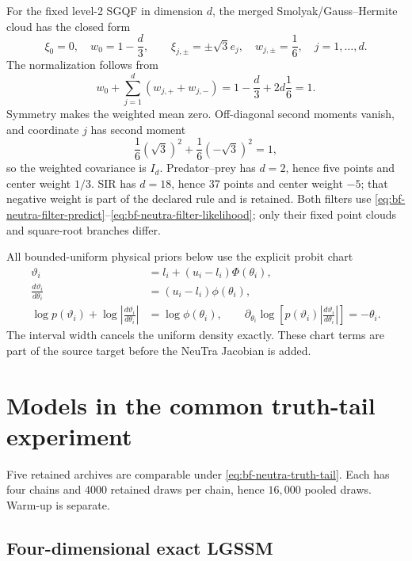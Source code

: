 For the fixed level-2 SGQF in dimension $d$, the merged Smolyak/Gauss--Hermite
cloud has the closed form
\begin{equation}
 \xi_0=0,\quad w_0=1-\frac d3,\qquad
 \xi_{j,\pm}=\pm\sqrt3e_j,\quad w_{j,\pm}=\frac16,\quad j=1,\ldots,d.
 \label{eq:bf-neutra-sgqf-rule}
\end{equation}
The normalization follows from
\begin{equation}
 w_0+\sum_{j=1}^d(w_{j,+}+w_{j,-})
 =1-\frac d3+2d\frac16=1.
\end{equation}
Symmetry makes the weighted mean zero.  Off-diagonal second moments vanish,
and coordinate $j$ has second moment
\begin{equation}
 \frac16(\sqrt3)^2+\frac16(-\sqrt3)^2=1,
\end{equation}
so the weighted covariance is $I_d$.  Predator--prey has $d=2$, hence five
points and center weight $1/3$.  SIR has $d=18$, hence 37 points and center
weight $-5$; that negative weight is part of the declared rule and is retained.
Both filters use
\eqref{eq:bf-neutra-filter-predict}--\eqref{eq:bf-neutra-filter-likelihood}; only
their fixed point clouds and square-root branches differ.

All bounded-uniform physical priors below use the explicit probit chart
\begin{align}
 \vartheta_i&=l_i+(u_i-l_i)\Phi(\theta_i),\\
 \frac{d\vartheta_i}{d\theta_i}&=(u_i-l_i)\phi(\theta_i),\\
 \log p(\vartheta_i)+\log\left|\frac{d\vartheta_i}{d\theta_i}\right|
 &=\log\phi(\theta_i),\qquad
 \partial_{\theta_i}\log\!\left[
 p(\vartheta_i)\left|\frac{d\vartheta_i}{d\theta_i}\right|\right]
 =-\theta_i.
 \label{eq:bf-neutra-probit-chart}
\end{align}
The interval width cancels the uniform density exactly.  These chart terms are
part of the source target before the NeuTra Jacobian is added.

\section{Models in the common truth-tail experiment}
\label{sec:bf-neutra-common-models}

Five retained archives are comparable under
\eqref{eq:bf-neutra-truth-tail}.  Each has four chains and $4000$ retained
draws per chain, hence $16{,}000$ pooled draws.  Warm-up is separate.

\subsection{Four-dimensional exact LGSSM}

